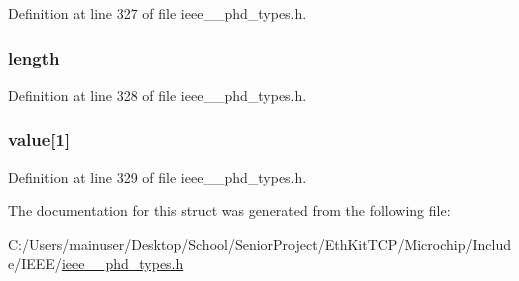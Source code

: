 Definition at line 327 of file ieee\+\_\+\_\+phd\+\_\+types.\+h.

\hypertarget{struct___segm_id_list_a3743679e4ff85e3e1b3fc2e59973fbb3}{}
\subsubsection[{length}]{ length}\label{struct___segm_id_list_a3743679e4ff85e3e1b3fc2e59973fbb3}


Definition at line 328 of file ieee\+\_\+\_\+phd\+\_\+types.\+h.

\hypertarget{struct___segm_id_list_aaf586cbf63af4bade307d577e5e182e9}{}
\subsubsection[{value}]{ value\mbox{[}1\mbox{]}}\label{struct___segm_id_list_aaf586cbf63af4bade307d577e5e182e9}


Definition at line 329 of file ieee\+\_\+\_\+phd\+\_\+types.\+h.



The documentation for this struct was generated from the following file\+:\begin{DoxyCompactItemize}
\item 
C\+:/\+Users/mainuser/\+Desktop/\+School/\+Senior\+Project/\+Eth\+Kit\+T\+C\+P/\+Microchip/\+Include/\+I\+E\+E\+E/\hyperlink{ieee__11073__phd__types_8h}{ieee\+\_\+\_\+phd\+\_\+types.\+h}\end{DoxyCompactItemize}
